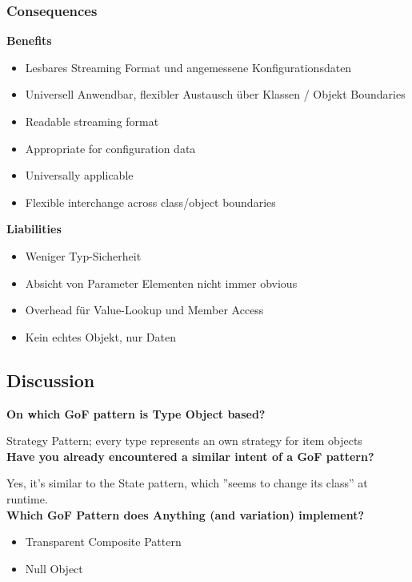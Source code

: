 \subsubsection{Consequences}
\textbf{Benefits}
\begin{itemize}
    \item Lesbares Streaming Format und angemessene Konfigurationsdaten
    \item Universell Anwendbar, flexibler Austausch über Klassen / Objekt Boundaries
    \item Readable streaming format
    \item Appropriate for configuration data
    \item Universally applicable
    \item Flexible interchange across class/object boundaries
\end{itemize}
\vspace{10pt}
\textbf{Liabilities}
\begin{itemize}
    \item Weniger Typ-Sicherheit
    \item Absicht von Parameter Elementen nicht immer obvious
    \item Overhead für Value-Lookup und Member Access
    \item Kein echtes Objekt, nur Daten
\end{itemize}

\subsection{Discussion}
\textbf{On which GoF pattern is Type Object based?}

Strategy Pattern; every type represents an own strategy for item objects \\

\textbf{Have you already encountered a similar intent of a GoF pattern?}

Yes, it’s similar to the State pattern, which ''seems to change its class'' at runtime. \\

\textbf{Which GoF Pattern does Anything (and variation) implement?}
\begin{itemize}
    \item Transparent Composite Pattern
    \item Null Object
\end{itemize}

